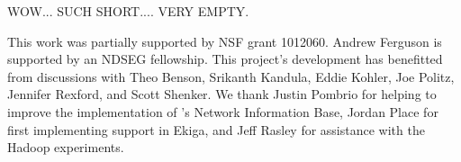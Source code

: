 
{\color{blue} WOW... SUCH SHORT.... VERY EMPTY.}

This work was partially supported by NSF grant 1012060.
Andrew Ferguson is supported by an NDSEG fellowship.
This project's development has benefitted from discussions with Theo Benson,
Srikanth Kandula, Eddie Kohler, Joe Politz, Jennifer Rexford, and Scott Shenker.
We thank Justin Pombrio for helping to improve the implementation of \sys's
Network Information Base, Jordan Place for first implementing \sys support
in Ekiga, and Jeff Rasley for assistance with the Hadoop experiments.
